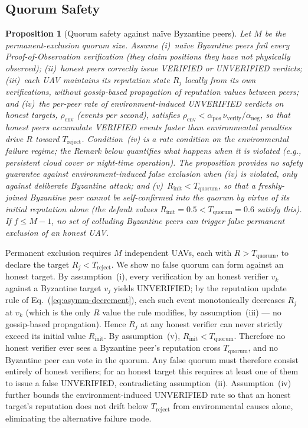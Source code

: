 \documentclass[journal,10pt,twocolumn]{IEEEtran}
\newtheorem{proposition}{Proposition}
\begin{document}
\subsection{Quorum Safety}
\label{sec:quorum-safety}

\begin{proposition}[Quorum safety against na\"ive Byzantine peers]
\label{prop:safety}
Let $M$ be the permanent-exclusion quorum size. Assume (i)~na\"ive Byzantine peers fail every Proof-of-Observation verification (they claim positions they have not physically observed); (ii)~honest peers correctly issue VERIFIED or UNVERIFIED verdicts; (iii)~each UAV maintains its reputation state $R_j$ locally from its own verifications, without gossip-based propagation of reputation values between peers; and (iv)~the per-peer rate of environment-induced UNVERIFIED verdicts on honest targets, $\rho_\text{env}$ (events per second), satisfies $\rho_\text{env} < \alpha_\text{pos}\, \nu_\text{verify}/\alpha_\text{neg}$, so that honest peers accumulate VERIFIED events faster than environmental penalties drive $R$ toward $T_\text{reject}$. Condition~(iv) is a \emph{rate condition on the environmental failure regime}; the Remark below quantifies what happens when it is violated (e.g., persistent cloud cover or night-time operation). The proposition provides no safety guarantee against environment-induced false exclusion when (iv) is violated, only against deliberate Byzantine attack; and (v)~$R_\text{init} < T_\text{quorum}$, so that a freshly-joined Byzantine peer cannot be self-confirmed into the quorum by virtue of its initial reputation alone (the default values $R_\text{init}=0.5 < T_\text{quorum}=0.6$ satisfy this). If $f \leq M-1$, no set of colluding Byzantine peers can trigger false permanent exclusion of an honest UAV.
\end{proposition}

\begin{IEEEproof}[Sketch]
Permanent exclusion requires $M$ independent UAVs, each with $R > T_\text{quorum}$, to declare the target $R_j < T_\text{reject}$. We show no false quorum can form against an honest target. By assumption~(i), every verification by an honest verifier $v_k$ against a Byzantine target $v_j$ yields UNVERIFIED; by the reputation update rule of Eq.~(\ref{eq:asymm-decrement}), each such event monotonically decreases $R_j$ at $v_k$ (which is the only $R$ value the rule modifies, by assumption~(iii) — no gossip-based propagation). Hence $R_j$ at any honest verifier can never strictly exceed its initial value $R_\text{init}$. By assumption~(v), $R_\text{init} < T_\text{quorum}$. Therefore no honest verifier ever sees a Byzantine peer's reputation cross $T_\text{quorum}$, and no Byzantine peer can vote in the quorum. Any false quorum must therefore consist entirely of honest verifiers; for an honest target this requires at least one of them to issue a false UNVERIFIED, contradicting assumption~(ii). Assumption~(iv) further bounds the environment-induced UNVERIFIED rate so that an honest target's reputation does not drift below $T_\text{reject}$ from environmental causes alone, eliminating the alternative failure mode.
\end{IEEEproof}
\end{document}
